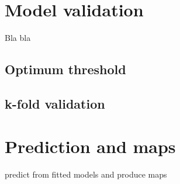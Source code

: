 \documentclass[
]{book}
\begin{document}
\hypertarget{model-validation}{%
\chapter{Model validation}\label{model-validation}}

Bla bla

\hypertarget{optimum-threshold}{%
\section{Optimum threshold}\label{optimum-threshold}}

\hypertarget{k-fold-validation}{%
\section{k-fold validation}\label{k-fold-validation}}

\hypertarget{prediction-and-maps}{%
\chapter{Prediction and maps}\label{prediction-and-maps}}

predict from fitted models and produce maps

  
\end{document}
